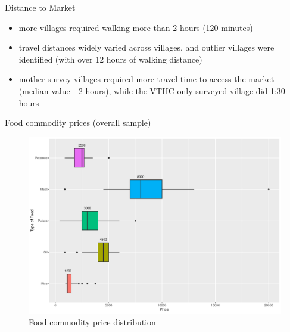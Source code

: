 \documentclass[
  ignorenonframetext,
]{beamer}
\providecommand{\tightlist}{%
  \setlength{\itemsep}{0pt}\setlength{\parskip}{0pt}}
\begin{document}
\begin{frame}{Distance to Market}
\protect\hypertarget{distance-to-market}{}
\begin{itemize}
\tightlist
\item
  more villages required walking more than 2 hours (120 minutes)\\
\item
  travel distances widely varied across villages, and outlier villages
  were identified (with over 12 hours of walking distance)\\
\item
  mother survey villages required more travel time to access the market
  (median value - 2 hours), while the VTHC only surveyed village did
  1:30 hours
\end{itemize}
\end{frame}

\begin{frame}{Food commodity prices (overall sample)}
\protect\hypertarget{foodprices}{}
\begin{figure}
\includegraphics[width=1\linewidth]{example_plots_files/figure-beamer/unnamed-chunk-15-1} \caption{Food commodity price distribution}\label{fig:unnamed-chunk-15}
\end{figure}
\end{frame}
\end{document}
